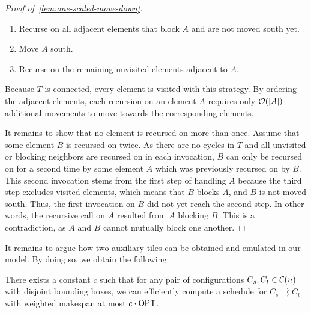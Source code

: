 \begin{proof}[Proof of~\cref{lem:one-scaled-move-down}]
	\begin{enumerate}
		\item Recurse on all adjacent elements that block $A$ and are not moved south yet.
		\item Move $A$ south.
		\item Recurse on the remaining unvisited elements adjacent to $A$.
	\end{enumerate}
	
	Because $T$ is connected, every element is visited with this strategy.
	By ordering the adjacent elements, each recursion on an element $A$ requires only $\mathcal{O}(|A|)$ additional movements to move towards the corresponding elements.
	
	It remains to show that no element is recursed on more than once.
	Assume that some element $B$ is recursed on twice.
	As there are no cycles in $T$ and all unvisited or blocking neighbors are recursed on in each invocation, $B$ can only be recursed on for a second time by some element $A$ which was previously recursed on by $B$.
	This second invocation stems from the first step of handling $A$ because the third step excludes visited elements, which means that $B$ blocks $A$, and $B$ is not moved south.
	Thus, the first invocation on $B$ did not yet reach the second step.
	In other words, the recursive call on $A$ resulted from $A$ blocking $B$.
	This is a contradiction, as $A$ and $B$ cannot mutually block one another.
\end{proof}

It remains to argue how two auxiliary tiles can be obtained and emulated in our model.
By doing so, we obtain the following.

\begin{theorem}
	\label{thm:reconfig-general}
	There exists a constant $c$ such that for any pair of configurations $C_s,C_t\in \mathcal{C}(n)$ with disjoint bounding boxes, we can efficiently compute a schedule for $C_s\rightrightarrows C_t$ with weighted makespan at most $c\cdot \textsf{OPT}$.
\end{theorem}

